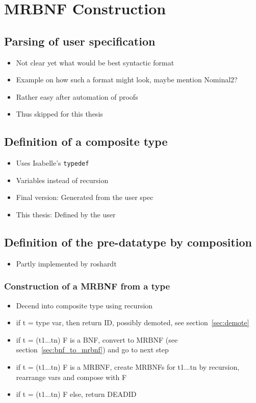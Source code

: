 \chapter{MRBNF Construction}

\section{Parsing of user specification}

\begin{itemize}
\item{Not clear yet what would be best syntactic format}
\item{Example on how such a format might look, maybe mention Nominal2?}
\item{Rather easy after automation of proofs}
\item{Thus skipped for this thesis}
\end{itemize}

\section{Definition of a composite type}

\begin{itemize}
\item{Uses Isabelle's \texttt{typedef}}
\item{Variables instead of recursion}
\item{Final version: Generated from the user spec}
\item{This thesis: Defined by the user}
\end{itemize}

\section{Definition of the pre-datatype by composition}

\begin{itemize}
\item{Partly implemented by roshardt~\cite{mrbnf_composition}}
\end{itemize}

\subsection{Construction of a MRBNF from a type}

\begin{itemize}
\item{Decend into composite type using recursion}
\item{if t = type var, then return ID, possibly demoted, see section~\ref{sec:demote}}
\item{if t = (t1...tn) F is a BNF, convert to MRBNF (see section~\ref{sec:bnf_to_mrbnf}) and go to next step}
\item{if t = (t1...tn) F is a MRBNF, create MRBNFs for t1...tn by recursion, rearrange vars and compose with F}
\item{if t = (t1...tn) F else, return DEADID}
\end{itemize}

